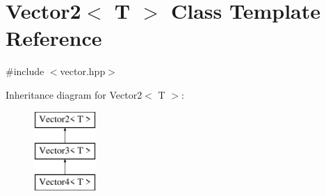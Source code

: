 \hypertarget{class_vector2}{}\section{Vector2$<$ T $>$ Class Template Reference}
\label{class_vector2}


{\ttfamily \#include $<$vector.\+hpp$>$}

Inheritance diagram for Vector2$<$ T $>$\+:\begin{figure}[H]
\begin{center}
\leavevmode
\includegraphics[height=3.000000cm]{class_vector2}
\end{center}
\end{figure}
